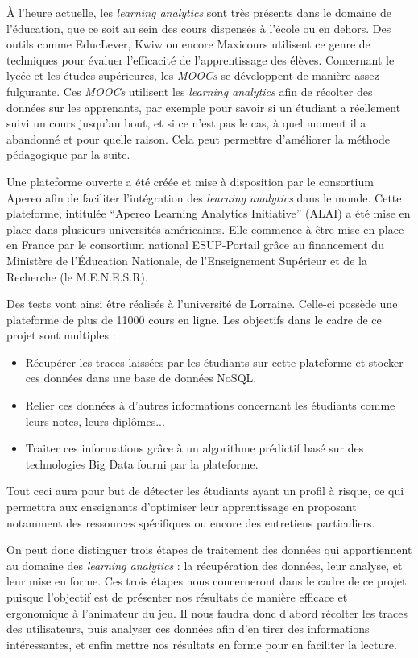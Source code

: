            À l’heure actuelle, les \emph{learning analytics} sont très présents dans le domaine de l’éducation, que ce soit au sein des cours dispensés à l’école ou en dehors. Des outils comme EducLever, Kwiw ou encore Maxicours utilisent ce genre de techniques pour évaluer l’efficacité de l’apprentissage des élèves. Concernant le lycée et les études supérieures, les \emph{MOOCs} se développent de manière assez fulgurante. Ces \emph{MOOCs} utilisent les \emph{learning analytics} afin de récolter des données sur les apprenants, par exemple pour savoir si un étudiant a réellement suivi un cours jusqu’au bout, et si ce n'est pas le cas, à quel moment il a abandonné et pour quelle raison. Cela peut permettre d'améliorer la méthode pédagogique par la suite.
        
            Une plateforme ouverte a été créée et mise à disposition par le consortium Apereo afin de faciliter l’intégration des \emph{learning analytics} dans le monde. Cette plateforme, intitulée \enquote{Apereo Learning Analytics Initiative} (ALAI) a été mise en place dans plusieurs universités américaines. Elle commence à être mise en place en France par le consortium national ESUP-Portail grâce au financement du Ministère de l’Éducation Nationale, de l’Enseignement Supérieur et de la Recherche (le M.E.N.E.S.R).
       
            Des tests vont ainsi être réalisés à l’université de Lorraine. Celle-ci possède une plateforme de plus de 11000 cours en ligne.
            Les objectifs dans le cadre de ce projet sont multiples :
            \begin{itemize}
                \item Récupérer les traces laissées par les étudiants sur cette plateforme et stocker ces données dans une base de données NoSQL.
                \item Relier ces données à d’autres informations concernant les étudiants comme leurs notes, leurs diplômes...
                \item Traiter ces informations grâce à un algorithme prédictif basé sur des technologies Big Data fourni par la plateforme.
            \end{itemize}


           Tout ceci aura pour but de détecter les étudiants ayant un profil à risque, ce qui permettra aux enseignants d’optimiser leur apprentissage en proposant notamment des ressources spécifiques ou encore des entretiens particuliers.
        
           On peut donc distinguer trois étapes de traitement des données qui appartiennent au domaine des \emph{learning analytics} : la récupération des données, leur analyse, et leur mise en forme. Ces trois étapes nous concerneront dans le cadre de ce projet puisque l’objectif est de présenter nos résultats de manière efficace et ergonomique à l’animateur du jeu. Il nous faudra donc d’abord récolter les traces des utilisateurs, puis analyser ces données afin d’en tirer des informations intéressantes, et enfin mettre nos résultats en forme pour en faciliter la lecture.
      
